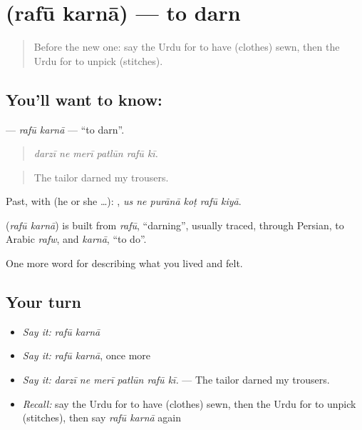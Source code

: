 \section[\texorpdfstring{\ur{رفو} \ur{کرنا} (rafū karnā)}{رفو کرنا (rafū karnā)}]{  (rafū karnā) — to darn}

\label{lesson:UR-C500-rafu-karna}



\begin{quote}
Before the new one: say the Urdu for to have (clothes) sewn, then the Urdu for to unpick (stitches).
\end{quote}

\subsection*{You'll want to know:  }
\textbf{ } — \emph{rafū karnā} — \textquotedblleft{}to darn\textquotedblright{}.

\begin{quote}
     
\end{quote}

\begin{quote}
\emph{darzī ne merī patlūn rafū kī.}
\end{quote}

\begin{quote}
The tailor darned my trousers.
\end{quote}

Past, with  (he or she …):      , \emph{us ne purānā koṭ rafū kiyā}.

\begin{cousinweb}
\textbf{ } (\emph{rafū karnā}) is built from \emph{rafū}, \textquotedblleft{}darning\textquotedblright{}, usually traced, through Persian, to Arabic \emph{rafw}, and \emph{karnā}, \textquotedblleft{}to do\textquotedblright{}.
\end{cousinweb}

\begin{grammarlens}[title={What you've built}]
One more word for describing what you lived and felt.
\end{grammarlens}

\subsection*{Your turn}
\begin{itemize}
\raggedright
  \item \emph{Say it:} \emph{rafū karnā}
  \item \emph{Say it:} \emph{rafū karnā}, once more
  \item \emph{Say it:} \emph{darzī ne merī patlūn rafū kī.} — The tailor darned my trousers.
  \item \emph{Recall:} say the Urdu for to have (clothes) sewn, then the Urdu for to unpick (stitches), then say \emph{rafū karnā} again
\end{itemize}

